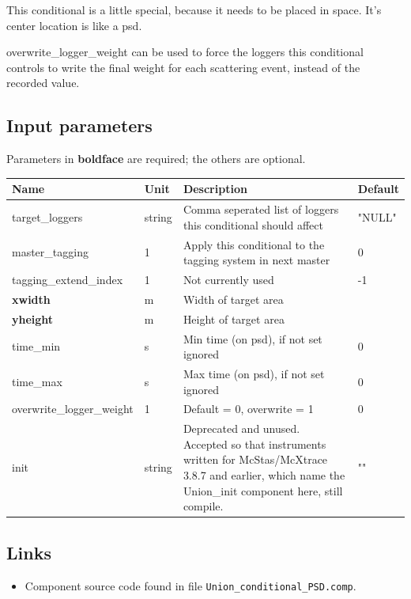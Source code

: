 This conditional is a little special, because it needs to be placed in space. It's center location is like a psd.

overwrite\_logger\_weight can be used to force the loggers this conditional controls to write the final weight for each scattering event, instead of the recorded value.

\subsection*{Input parameters}
Parameters in \textbf{boldface} are required; the others are optional.

\begin{longtable}{p{}p{}p{}p{}}
\toprule
\textbf{Name} & \textbf{Unit} & \textbf{Description} & \textbf{Default} \\
\midrule
\endhead
target\_loggers & string & Comma seperated list of loggers this conditional should affect & "NULL" \\
master\_tagging & 1 & Apply this conditional to the tagging system in next master & 0 \\
tagging\_extend\_index & 1 & Not currently used & -1 \\
\textbf{xwidth} & m & Width of target area &  \\
\textbf{yheight} & m & Height of target area &  \\
time\_min & s & Min time (on psd), if not set ignored & 0 \\
time\_max & s & Max time (on psd), if not set ignored & 0 \\
overwrite\_logger\_weight & 1 & Default = 0, overwrite = 1 & 0 \\
init & string & Deprecated and unused. Accepted so that instruments written for McStas/McXtrace 3.8.7 and earlier, which name the Union\_init component here, still compile. & "" \\
\bottomrule
\end{longtable}

\subsection*{Links}
\begin{itemize}
  \item Component source code found in file \texttt{Union\_conditional\_PSD.comp}.
\end{itemize}
